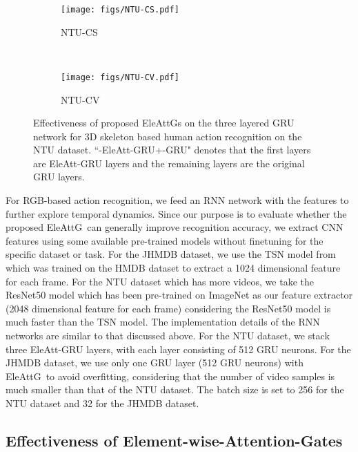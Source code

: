 \documentclass[runningheads]{llncs}
\newcommand{\Outer}{Element-wise}
\newcommand{\EleAttGn}{{EleAttG}}
\newcommand{\EleAttG}{{EleAttG~}}
\begin{document}
\begin{figure}[t] \setlength{\belowcaptionskip}{-10pt}
	\centering
	\begin{subfigure}[t]{0.45\linewidth}
		\centering\texttt{[image: figs/NTU-CS.pdf]}
		\caption{NTU-CS}
		\label{subfig:CS}
	\end{subfigure}	
	~~
	\begin{subfigure}[t]{0.45\linewidth}
		\centering\texttt{[image: figs/NTU-CV.pdf]}
		\caption{NTU-CV}			
		\label{subfig:CV}
	\end{subfigure}
\caption{Effectiveness of proposed {\EleAttGn}s on the three layered GRU network for 3D skeleton based human action recognition on the NTU dataset. ``-EleAtt-GRU+-GRU" denotes that the first  layers are EleAtt-GRU layers and the remaining  layers are the original GRU layers.}\label{fig:layer}
\end{figure}


For RGB-based action recognition, we feed an RNN network with the features to further explore temporal dynamics. Since our purpose is to evaluate whether the proposed \EleAttG can generally improve recognition accuracy, we extract CNN features using some available pre-trained models without finetuning for the specific dataset or task. For the JHMDB dataset, we use the TSN model from \cite{wang2016temporal,TSNModel} which was trained on the HMDB dataset \cite{kuehne2011hmdb} to extract a 1024 dimensional feature for each frame. For the NTU dataset which has more videos, we take the ResNet50 model \cite{he2016deep,ResNet50Model} which has been pre-trained on ImageNet as our feature extractor (2048 dimensional feature for each frame) considering the ResNet50 model is much faster than the TSN model. The implementation details of the RNN networks are similar to that discussed above. For the NTU dataset, we stack three EleAtt-GRU layers, with each layer consisting of 512 GRU neurons. For the JHMDB dataset, we use only one GRU layer (512 GRU neurons) with \EleAttG to avoid overfitting, considering that the number of video samples is much smaller than that of the NTU dataset. The batch size is set to 256 for the NTU dataset and 32 for the JHMDB dataset.


\subsection{Effectiveness of \Outer-Attention-Gates} 
\end{document}
